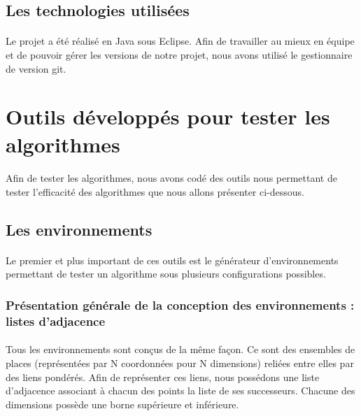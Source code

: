 \documentclass[pidr]{tnreport}
\begin{document}
		\subsection{Les technologies utilisées}

\paragraph{}
Le projet a été réalisé en Java sous Eclipse. \linebreak
Afin de travailler au mieux en équipe et de pouvoir gérer les versions de notre projet, nous avons utilisé le gestionnaire de version git. \linebreak
		
	\section{Outils développés pour tester les algorithmes}
	
\paragraph{}
Afin de tester les algorithmes, nous avons codé des outils nous permettant de tester l'efficacité des algorithmes que nous allons présenter ci-dessous.

		\subsection{Les environnements}

\paragraph{}
Le premier et plus important de ces outils est le générateur d'environnements permettant de tester un algorithme sous plusieurs configurations possibles.

			\subsubsection{Présentation générale de la conception des environnements : listes d'adjacence}
			
\paragraph{}
Tous les environnements sont conçus de la même façon. Ce sont des ensembles de places (représentées par N coordonnées pour N dimensions) reliées entre elles par des liens pondérés. Afin de représenter ces liens, nous possédons une liste d'adjacence associant à chacun des points la liste de ses successeurs. Chacune des dimensions possède une borne supérieure et inférieure.
	
\end{document}
